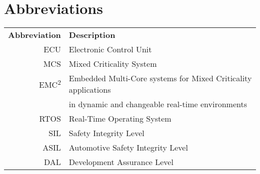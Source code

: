 \chapter*{Abbreviations}
\noindent{}\begin{tabular}{r l}
\textbf{Abbreviation} 	& \textbf{Description} \vspace{.5em} \\
ECU		&Electronic Control Unit\\
MCS		&Mixed Criticality System\\
EMC\textsuperscript{2}	&Embedded Multi-Core systems for Mixed Criticality applications\\
 		&in dynamic and changeable real-time environments\\
RTOS	&Real-Time Operating System\\
SIL		&Safety Integrity Level\\
ASIL	&Automotive Safety Integrity Level\\
DAL		&Development Assurance Level\\
\end{tabular}